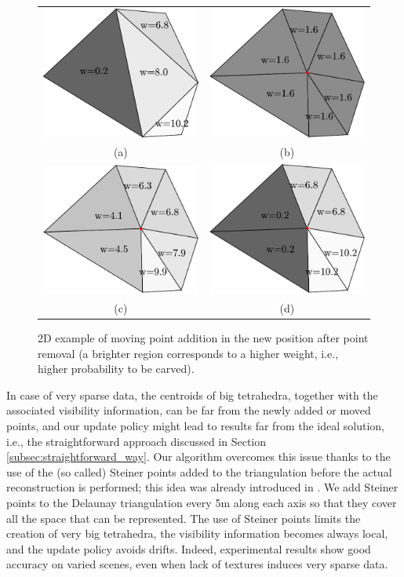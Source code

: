 \begin{figure}[t]
\begin{center}
\begin{tabular}{cc}
\centering
\includegraphics[width=0.21\columnwidth]{./img//mooving_orig}&
\includegraphics[width=0.21\columnwidth]{./img//mooving_avg}\\
(a) & (b) \\
\includegraphics[width=0.21\columnwidth]{./img//mooving_weighted_avg}&
\includegraphics[width=0.21\columnwidth]{./img//mooving_min}\\ (c) & (d)\\
\end{tabular}
\end{center}
\caption{2D example of moving point addition in the new position after point removal (a brighter region corresponds to a higher weight, i.e., higher probability to be carved).}
\label{fig:reconstrEx_2}
\end{figure}

In case of very sparse data, the centroids of big tetrahedra, together with the associated visibility information, can be far from the newly added or moved points, and our update policy might lead to results far from the ideal solution, i.e., the straightforward approach discussed in Section \ref{subsec:straightforward_way}. Our algorithm overcomes this issue thanks to the use of the (so called) Steiner points added to the triangulation before the actual reconstruction is performed; this idea was already introduced in \cite{litvinov_lhuillier_13}.
We add Steiner points to the Delaunay triangulation every 5m along each axis so that they cover all the space that can be represented. The use of Steiner points limits the creation of very big tetrahedra, the visibility information becomes always local, and the update policy avoids drifts. Indeed, experimental results show good accuracy on varied scenes, even when lack of textures induces very sparse data.


